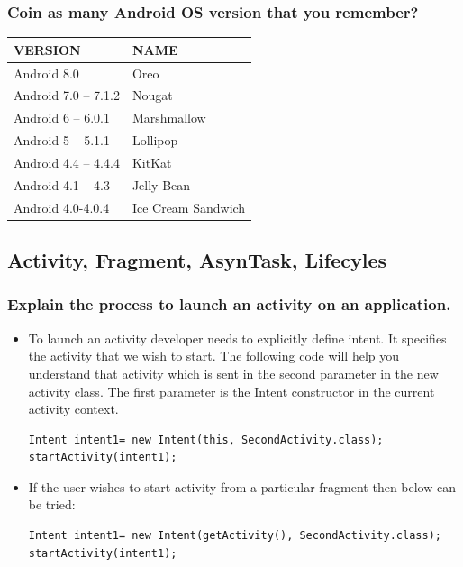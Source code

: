 \documentclass[9pt, b5paper]{article}
\begin{document}
\subsubsection{Coin as many Android OS version that you remember?}
\label{sec-1-1-9}
\begin{center}
\begin{tabular}{ll}
\hline
VERSION & NAME\\
\hline
Android 8.0 & Oreo\\
Android 7.0 – 7.1.2 & Nougat\\
Android 6 – 6.0.1 & Marshmallow\\
Android 5 – 5.1.1 & Lollipop\\
Android 4.4 – 4.4.4 & KitKat\\
Android 4.1 – 4.3 & Jelly Bean\\
Android 4.0-4.0.4 & Ice Cream Sandwich\\
\hline
\end{tabular}
\end{center}

\subsection{Activity, Fragment, AsynTask, Lifecyles}
\label{sec-1-2}
\subsubsection{Explain the process to launch an activity on an application.}
\label{sec-1-2-1}
\begin{itemize}
\item To launch an activity developer needs to explicitly define intent. It specifies the activity that we wish to start. The following code will help you understand that activity which is sent in the second parameter in the new activity class. The first parameter is the Intent constructor in the current activity context.
\begin{verbatim}
Intent intent1= new Intent(this, SecondActivity.class);
startActivity(intent1);
\end{verbatim}

\item If the user wishes to start activity from a particular fragment then below can be tried: 
\begin{verbatim}
Intent intent1= new Intent(getActivity(), SecondActivity.class);
startActivity(intent1);
\end{verbatim}
\end{itemize}
\end{document}
